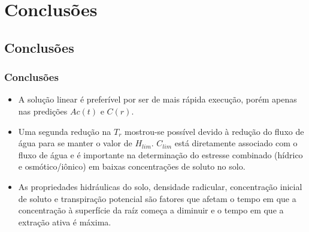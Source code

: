 \section{Conclusões}
\subsection{Conclusões}

\begin{frame}
\frametitle{Conclusões}
\begin{itemize}
  \item A solução linear é preferível por ser de mais rápida execução, porém apenas nas predições $Ac(t)$ e $C(r)$.
  \item Uma segunda redução na $T_r$ mostrou-se possível devido à redução do fluxo de água para se manter o valor de $H_{lim}$.
        $C_{lim}$ está diretamente associado com o fluxo de água e é importante na determinação do estresse combinado (hídrico e osmótico/iônico) em baixas concentrações de soluto no solo. 

  \item As propriedades hidráulicas do solo, densidade radicular, concentração inicial de soluto e transpiração potencial são fatores que afetam o tempo em que a concentração à superfície da raíz começa a diminuir e o tempo em que a extração ativa é máxima.

\end{itemize}

\end{frame}

